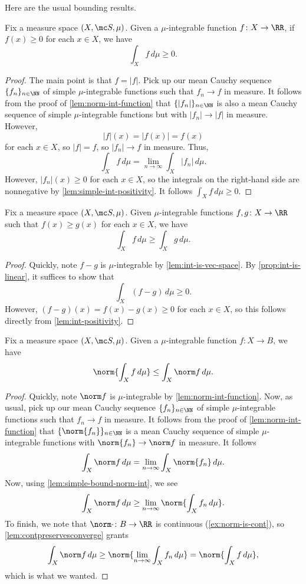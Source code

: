 \documentclass[../notes.tex]{subfiles}
\begin{document}
Here are the usual bounding results.
\begin{lemma} \label{lem:int-positivity}
	Fix a measure space $(X,\mc S,\mu)$. Given a $\mu$-integrable function $f\colon X\to\RR$, if $f(x)\ge0$ for each $x\in X$, we have
	\[\int_Xf\,d\mu\ge0.\]
\end{lemma}
\begin{proof}
	The main point is that $f=|f|$. Pick up our mean Cauchy sequence $\{f_n\}_{n\in\NN}$ of simple $\mu$-integrable functions such that $f_n\to f$ in measure. It follows from the proof of \autoref{lem:norm-int-function} that $\{|f_n|\}_{n\in\NN}$ is also a mean Cauchy sequence of simple $\mu$-integrable functions but with $|f_n|\to|f|$ in measure. However,
	\[|f|(x)=|f(x)|=f(x)\]
	for each $x\in X$, so $|f|=f$, so $|f_n|\to f$ in measure. Thus,
	\[\int_Xf\,d\mu=\lim_{n\to\infty}\int_X|f_n|\,d\mu.\]
	However, $|f_n|(x)\ge0$ for each $x\in X$, so the integrals on the right-hand side are nonnegative by \autoref{lem:simple-int-positivity}. It follows $\int_Xf\,d\mu\ge0$.
\end{proof}
\begin{lemma} \label{lem:bound-ints}
	Fix a measure space $(X,\mc S,\mu)$. Given $\mu$-integrable functions $f,g\colon X\to\RR$ such that $f(x)\ge g(x)$ for each $x\in X$, we have
	\[\int_Xf\,d\mu\ge\int_Xg\,d\mu.\]
\end{lemma}
\begin{proof}
	Quickly, note $f-g$ is $\mu$-integrable by \autoref{lem:int-is-vec-space}. By \autoref{prop:int-is-linear}, it suffices to show that
	\[\int_X(f-g)\,d\mu\ge0.\]
	However, $(f-g)(x)=f(x)-g(x)\ge0$ for each $x\in X$, so this follows directly from \autoref{lem:int-positivity}.
\end{proof}
\begin{lemma} \label{lem:bound-norm-int}
	Fix a measure space $(X,\mc S,\mu)$. Given a $\mu$-integrable function $f\colon X\to B$, we have
	\[\norm{\int_Xf\,d\mu}\le\int_X\norm f\,d\mu.\]
\end{lemma}
\begin{proof}
	Quickly, note $\norm f$ is $\mu$-integrable by \autoref{lem:norm-int-function}. Now, as usual, pick up our mean Cauchy sequence $\{f_n\}_{n\in\NN}$ of simple $\mu$-integrable functions such that $f_n\to f$ in measure. It follows from the proof of \autoref{lem:norm-int-function} that $\{\norm{f_n}\}_{n\in\NN}$ is a mean Cauchy sequence of simple $\mu$-integrable functions with $\norm{f_n}\to\norm f$ in measure. It follows
	\[\int_X\norm f\,d\mu=\lim_{n\to\infty}\int_X\norm{f_n}\,d\mu.\]
	Now, using \autoref{lem:simple-bound-norm-int}, we see
	\[\int_X\norm f\,d\mu\ge\lim_{n\to\infty}\norm{\int_Xf_n\,d\mu}.\]
	To finish, we note that $\norm\cdot\colon B\to\RR$ is continuous (\autoref{ex:norm-is-cont}), so \autoref{lem:contpreservesconverge} grants
	\[\int_X\norm f\,d\mu\ge\norm{\lim_{n\to\infty}\int_Xf_n\,d\mu}=\norm{\int_Xf\,d\mu},\]
	which is what we wanted.
\end{proof}
\end{document}
